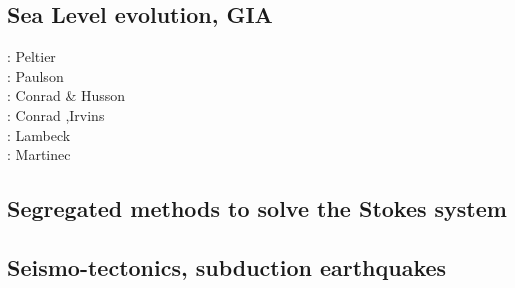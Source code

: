 \subsection{Sea Level evolution, GIA}

\begin{scriptsize}
\nineteenseventyeight: Peltier \etal \cite{pefc78}\\
\twothousandseven: Paulson \etal \cite{pazw07}\\
\twothousandnine: Conrad \& Husson \cite{cohu09}\\
\twothousandthirteen: Conrad \cite{conr13},Irvins \etal \cite{ivjw13}\\
\twothousandfourteen: Lambeck \etal \cite{larp14}\\
\twothousandeighteen: Martinec \etal \cite{makv18}
\end{scriptsize}

\subsection{Segregated methods to solve the Stokes system}

\begin{scriptsize}
\cite{raju91}
\cite{haeh93}
\cite{leru95}
\cite{duto98}
\cite{wade03}
\cite{wade04}
\cite{utne08}
\end{scriptsize}

\subsection{Seismo-tectonics, subduction earthquakes}

